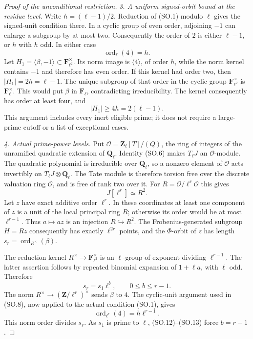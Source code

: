 \begin{proof}[Proof of the unconditional restriction]
\emph{3. A uniform signed-orbit bound at the residue level.}
Write $h=(\ell-1)/2$.  Reduction of (SO.1) modulo $\ell$ gives
the signed-unit condition there.  In a cyclic group of even
order, adjoining $-1$ can enlarge a subgroup by at most two.
Consequently the order of $2$ is either $\ell-1$, or $h$ with
$h$ odd.  In either case
\[
                       \operatorname{ord}_\ell(4)=h.       \tag{SO.8}
\]
Let $H_1=\langle\beta,-1\rangle\subset\mathbf F_{\ell^2}^\times$.
Its norm image is $\langle4\rangle$, of order $h$, while the
norm kernel contains $-1$ and therefore has even order.
If this kernel had order two, then $|H_1|=2h=\ell-1$.
The unique subgroup of that order in the cyclic group
$\mathbf F_{\ell^2}^\times$ is $\mathbf F_\ell^\times$.
This would put $\beta$ in $\mathbf F_\ell$, contradicting
irreducibility.  The kernel consequently has order at least
four, and
\[
                          |H_1|\ge4h=2(\ell-1).            \tag{SO.9}
\]
This argument includes every inert eligible prime; it does not
require a large-prime cutoff or a list of exceptional cases.

\emph{4. Actual prime-power levels.}
Put $\mathcal O=\mathbf Z_\ell[T]/(Q)$, the ring of integers
of the unramified quadratic extension of $\mathbf Q_\ell$.
Identity (SO.6) makes $T_\ell J$ an $\mathcal O$-module.
The quadratic polynomial is irreducible over $\mathbf Q_\ell$,
so a nonzero element of $\mathcal O$ acts invertibly on
$T_\ell J\otimes\mathbf Q_\ell$.  The Tate module is therefore
torsion free over the discrete valuation ring $\mathcal O$,
and is free of rank two over it.  For
$R=\mathcal O/\ell^r\mathcal O$ this gives
\[
                              J[\ell^r]\simeq R^2.
\]
Let $z$ have exact additive order $\ell^r$.  In these coordinates
at least one component of $z$ is a unit of the local principal
ring $R$; otherwise its order would be at most $\ell^{r-1}$.
Thus $a\mapsto az$ is an injection $R\hookrightarrow R^2$.
The Frobenius-generated subgroup $H=Rz$ consequently has
exactly $\ell^{2r}$ points, and the $\Phi$-orbit of $z$ has
length $s_r=\operatorname{ord}_{R^\times}(\beta)$.

The reduction kernel $R^\times\to\mathbf F_{\ell^2}^\times$
is an $\ell$-group of exponent dividing $\ell^{r-1}$.
The latter assertion follows by repeated binomial expansion of
$1+\ell a$, with $\ell$ odd.  Therefore
\[
                           s_r=s_1\ell^b,
                         \qquad0\le b\le r-1.              \tag{SO.12}
\]
The norm $R^\times\to(\mathbf Z/\ell^r)^\times$ sends
$\beta$ to $4$.  The cyclic-unit argument used in (SO.8),
now applied to the actual condition (SO.1), gives
\[
                   \operatorname{ord}_{\ell^r}(4)
                         =h\ell^{r-1}.                    \tag{SO.13}
\]
This norm order divides $s_r$.  As $s_1$ is prime to $\ell$,
(SO.12)--(SO.13) force $b=r-1$.


\end{proof}

